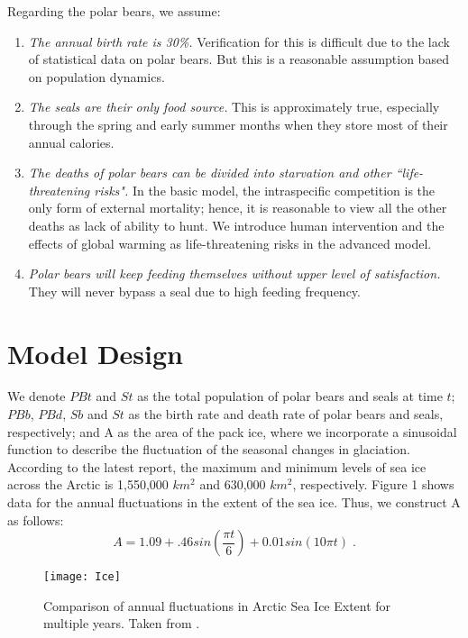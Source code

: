 \documentclass[reqno,11pt]{amsart}
\begin{document}
Regarding the polar bears, we assume:
\begin{enumerate}
\item \emph{The annual birth rate is 30\%.} Verification for this is difficult due to the lack of statistical data on polar bears. But this is a reasonable assumption based on population dynamics.
\item \emph{The seals are their only food source.} This is approximately true, especially through the spring and early summer months when they store most of their annual calories.\cite{Stirling}
\item \emph{The deaths of polar bears can be divided into starvation and other ``life-threatening risks".} In the basic model, the intraspecific competition is the only form of external mortality; hence, it is reasonable to view all the other deaths as lack of ability to hunt. We introduce human intervention and the effects of global warming as life-threatening risks in the advanced model.\cite{Bear_pop}
\item \emph{Polar bears will keep feeding themselves without upper level of satisfaction.} They will never bypass a seal due to high feeding frequency.
\end{enumerate}

\section{Model Design}
\label{sec:design}
We denote $PBt$ and $St$ as the total population of polar bears and seals at time $t$; $PBb$, $PBd$, $Sb$ and $St$ as the birth rate and death rate of polar bears and seals, respectively; and A as the area of the pack ice, where we incorporate a sinusoidal function to describe the fluctuation of the seasonal changes in glaciation.  According to the latest report, the maximum and minimum levels of sea ice across the Arctic is  1,550,000 $km^2$ and 630,000 $km^2$, respectively.\cite{Ice} Figure 1 shows data for the annual fluctuations in the extent of the sea ice. Thus, we construct A as follows:
\begin{equation}
\label{eq:A}
A = 1.09 + .46sin(\frac{\pi t}{6}) + 0.01sin(10\pi t)\;.
\end{equation}

\begin{figure}
\texttt{[image: Ice]}
\vspace{-1.5em}
\caption{Comparison of annual fluctuations in Arctic Sea Ice Extent for multiple years. Taken from \cite{Ice}.}
\end{figure}
\end{document}
